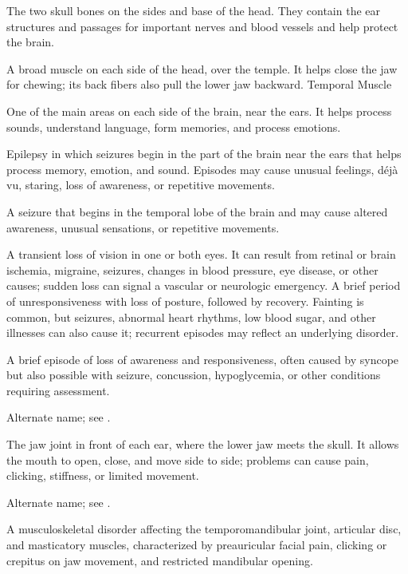  The two skull bones on the sides and base of the head. They contain the ear structures and passages for important nerves and blood vessels and help protect the brain.

 A broad muscle on each side of the head, over the temple. It helps close the jaw for chewing; its back fibers also pull the lower jaw backward.
\synonyms
Temporal Muscle

 One of the main areas on each side of the brain, near the ears. It helps process sounds, understand language, form memories, and process emotions.

 Epilepsy in which seizures begin in the part of the brain near the ears that helps process memory, emotion, and sound. Episodes may cause unusual feelings, déjà vu, staring, loss of awareness, or repetitive movements.

 A seizure that begins in the temporal lobe of the brain and may cause altered awareness, unusual sensations, or repetitive movements.

 A transient loss of vision in one or both eyes. It can result from retinal or brain ischemia, migraine, seizures, changes in blood pressure, eye disease, or other causes; sudden loss can signal a vascular or neurologic emergency.
 A brief period of unresponsiveness with loss of posture, followed by recovery. Fainting is common, but seizures, abnormal heart rhythms, low blood sugar, and other illnesses can also cause it; recurrent episodes may reflect an underlying disorder.

 A brief episode of loss of awareness and responsiveness, often caused by syncope but also possible with seizure, concussion, hypoglycemia, or other conditions requiring assessment.

 Alternate name; see .

 The jaw joint in front of each ear, where the lower jaw meets the skull. It allows the mouth to open, close, and move side to side; problems can cause pain, clicking, stiffness, or limited movement.

 Alternate name; see .

 A musculoskeletal disorder affecting the temporomandibular joint, articular disc, and masticatory muscles, characterized by preauricular facial pain, clicking or crepitus on jaw movement, and restricted mandibular opening.

